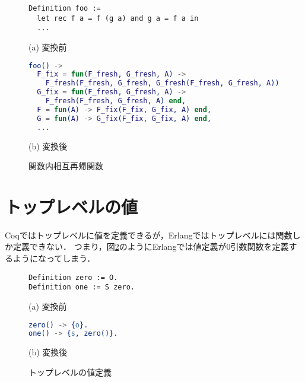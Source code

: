 \begin{figure}\centering
\begin{minipage}{1\textwidth}\centering
\begin{lstlisting}[frame=single,numbers=none,xleftmargin=0pt]
Definition foo :=
  let rec f a = f (g a) and g a = f a in
  ...
\end{lstlisting}
(a) 変換前
\end{minipage}
\begin{minipage}{1\textwidth}\centering
\begin{lstlisting}[frame=single,numbers=none,xleftmargin=0pt,language=Erlang]
foo() ->
  F_fix = fun(F_fresh, G_fresh, A) ->
    F_fresh(F_fresh, G_fresh, G_fresh(F_fresh, G_fresh, A)) end,
  G_fix = fun(F_fresh, G_fresh, A) ->
    F_fresh(F_fresh, G_fresh, A) end,
  F = fun(A) -> F_fix(F_fix, G_fix, A) end,
  G = fun(A) -> G_fix(F_fix, G_fix, A) end,
  ...
\end{lstlisting}
(b) 変換後
\end{minipage}
\label{code:extraction:recursive}
\caption{関数内相互再帰関数}
\end{figure}

\section{トップレベルの値}

Coqではトップレベルに値を定義できるが，Erlangではトップレベルには関数しか定義できない．
つまり，図\ref{code:extraction:toplevel-value-impossible}のようにErlangでは値定義が0引数関数を定義するようになってしまう．

\begin{figure}\centering
\begin{minipage}{0.4\textwidth}\centering
\begin{lstlisting}[frame=single,numbers=none,xleftmargin=0pt]
Definition zero := O.
Definition one := S zero.
\end{lstlisting}
(a) 変換前
\end{minipage}
\hspace*{3ex}
\begin{minipage}{0.4\textwidth}\centering
\begin{lstlisting}[frame=single,numbers=none,xleftmargin=0pt,language=Erlang]
zero() -> {o}.
one() -> {s, zero()}.
\end{lstlisting}
(b) 変換後
\end{minipage}
\label{code:extraction:toplevel-value-impossible}
\caption{トップレベルの値定義}
\end{figure}


